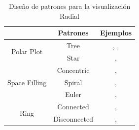 \begin{table}[h]
\centering
\begin{tabular}{|c|c|c|}
\hline
                  & Patrones & Ejemplos  \\ \hline
\multirow{2}{*}{Polar Plot} &Tree  & \cite{Jankun:2003:MoireGraphs}, \cite{Lamping:1995:FTB},  \\ \cline{2-3} 
                  & Star  &\cite{kandogan:2000:starcoordinates}, \cite{havre2001interactive}\\ \hline
\multirow{3}{*}{Space Filling} 
									& Concentric & \cite{cugini1996interactive}, \cite{keim2006monitoring}  \\ \cline{2-3} 
                  & Spiral & \cite{Carlis:1998:IVS}, \cite{dragicevic2002spiraclock} \\ \cline{2-3} 
                  & Euler & \cite{van2003bubbleworld}, \cite{hong2003zoomology} \\ \hline
\multirow{2}{*}{Ring} & Connected & \cite{livnat2005visualization}, \cite{salton1996automatic} \\ \cline{2-3} 
                  & Disconnected & \cite{brewer2000collaborative}, \cite{draper2008votes} \\ \hline
\end{tabular}
\label{table:vr}
\caption{Diseño de patrones para la visualización Radial }
\end{table}



